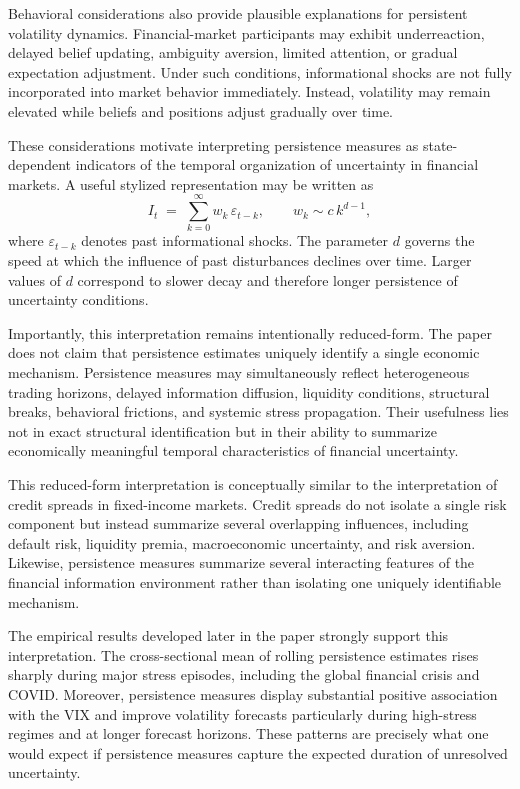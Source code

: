 \documentclass[unnumsec,webpdf,contemporary,large]{oup-authoring-template}%
\theoremstyle{thmstyleone}%
\theoremstyle{thmstyletwo}%
\theoremstyle{thmstylethree}%
\begin{document}
Behavioral considerations also provide plausible explanations for
persistent volatility dynamics. Financial-market participants may exhibit
underreaction, delayed belief updating, ambiguity aversion, limited
attention, or gradual expectation adjustment. Under such conditions,
informational shocks are not fully incorporated into market behavior
immediately. Instead, volatility may remain elevated while beliefs and
positions adjust gradually over time.

These considerations motivate interpreting persistence measures as
state-dependent indicators of the temporal organization of uncertainty in
financial markets. A useful stylized representation may be written as
\begin{equation}
  I_t \;=\; \sum_{k=0}^{\infty} w_k\, \varepsilon_{t-k}, \qquad
  w_k \sim c\, k^{d-1},
\end{equation}
where $\varepsilon_{t-k}$ denotes past informational shocks. The parameter
$d$ governs the speed at which the influence of past disturbances declines
over time. Larger values of $d$ correspond to slower decay and therefore
longer persistence of uncertainty conditions.

Importantly, this interpretation remains intentionally reduced-form. The
paper does not claim that persistence estimates uniquely identify a single
economic mechanism. Persistence measures may simultaneously reflect
heterogeneous trading horizons, delayed information diffusion, liquidity
conditions, structural breaks, behavioral frictions, and systemic stress
propagation. Their usefulness lies not in exact structural identification
but in their ability to summarize economically meaningful temporal
characteristics of financial uncertainty.

This reduced-form interpretation is conceptually similar to the
interpretation of credit spreads in fixed-income markets. Credit spreads do
not isolate a single risk component but instead summarize several
overlapping influences, including default risk, liquidity premia,
macroeconomic uncertainty, and risk aversion. Likewise, persistence
measures summarize several interacting features of the financial information
environment rather than isolating one uniquely identifiable mechanism.

The empirical results developed later in the paper strongly support this
interpretation. The cross-sectional mean of rolling persistence estimates
rises sharply during major stress episodes, including the global financial
crisis and COVID. Moreover, persistence measures display substantial
positive association with the VIX and improve volatility forecasts
particularly during high-stress regimes and at longer forecast horizons.
These patterns are precisely what one would expect if persistence measures
capture the expected duration of unresolved uncertainty.
\end{document}
